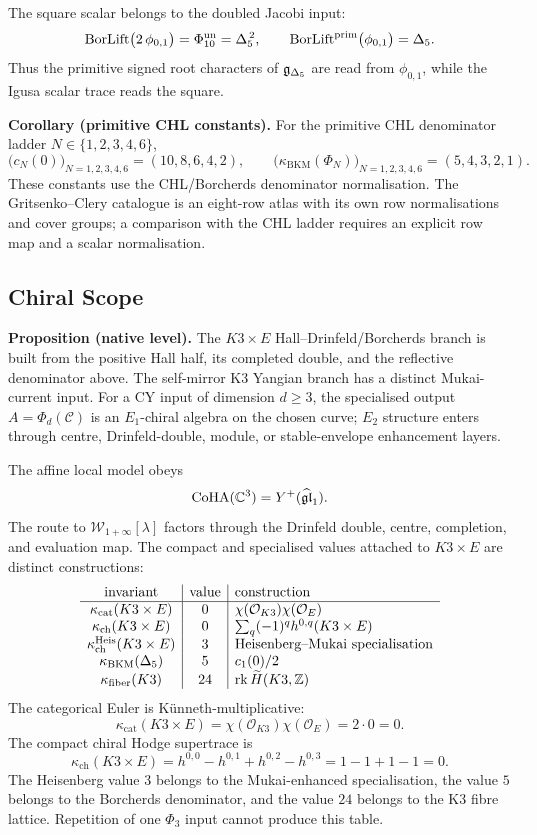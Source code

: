The square scalar belongs to the doubled Jacobi input:
\[
\mathrm{BorLift}\bigl(2\,\phi_{0,1}\bigr)=\Phi{}_{10}^{\mathrm{un}}
=\Delta{}_{5}^{\,2}, \qquad
\mathrm{BorLift}^{\mathrm{prim}}\bigl(\phi_{0,1}\bigr)=\Delta{}_{5} .
\]
Thus the primitive signed root characters of
$\mathfrak{g}_{\Delta{}_{5}}$ are read from $\phi_{0,1}$, while the
Igusa scalar trace reads the square.

\noindent\textbf{Corollary (primitive CHL constants).}
For the primitive CHL denominator ladder
$N\in\{1,2,3,4,6\}$,
\[
\bigl(c_N(0)\bigr)_{N=1,2,3,4,6}=(10,8,6,4,2),\qquad
\bigl(\kappa_{\mathrm{BKM}}(\Phi_N)\bigr)_{N=1,2,3,4,6}=(5,4,3,2,1).
\]
These constants use the CHL/Borcherds denominator normalisation.
The Gritsenko--Clery catalogue is an eight-row atlas with its own row
normalisations and cover groups; a comparison with the CHL ladder
requires an explicit row map and a scalar normalisation.

\subsection*{Chiral Scope}

\noindent\textbf{Proposition (native level).}
The $K3\times E$ Hall--Drinfeld/Borcherds branch is built from the
positive Hall half, its completed double, and the reflective denominator
above. The self-mirror K3 Yangian branch has a distinct Mukai-current
input. For a CY input of dimension $d\geq 3$, the specialised output
$A=\Phi_d(\mathcal{C})$ is an $E_1$-chiral algebra on the chosen curve;
$E_2$ structure enters through centre, Drinfeld-double, module, or
stable-envelope enhancement layers.

The affine local model obeys
\[
\operatorname{CoHA}(\mathbb{C}^{3})=Y^+(\widehat{\mathfrak{gl}}_1).
\]
The route to $\mathcal{W}_{1+\infty}[\lambda]$ factors through the
Drinfeld double, centre, completion, and evaluation map. The compact
and specialised values attached to $K3\times E$ are distinct
constructions:
\[
\begin{array}{c|c|l}
\text{invariant} & \text{value} & \text{construction}\\
\hline
\kappa_{\mathrm{cat}}(K3\times E) & 0 &
\chi(\mathcal{O}_{K3})\chi(\mathcal{O}_{E})\\
\kappa_{\mathrm{ch}}(K3\times E) & 0 &
\sum_q(-1)^q h^{0,q}(K3\times E)\\
\kappa_{\mathrm{ch}}^{\mathrm{Heis}}(K3\times E) & 3 &
\text{Heisenberg--Mukai specialisation}\\
\kappa_{\mathrm{BKM}}(\Delta{}_{5}) & 5 &
c_1(0)/2\\
\kappa_{\mathrm{fiber}}(K3) & 24 &
\mathrm{rk}\,\widetilde H(K3,\mathbb{Z})
\end{array}
\]
The categorical Euler is K\"unneth-multiplicative:
\[
\kappa_{\mathrm{cat}}(K3\times E)
=\chi(\mathcal{O}_{K3})\chi(\mathcal{O}_{E})
=2\cdot 0
=0 .
\]
The compact chiral Hodge supertrace is
\[
\kappa_{\mathrm{ch}}(K3\times E)
=h^{0,0}-h^{0,1}+h^{0,2}-h^{0,3}
=1-1+1-1
=0 .
\]
The Heisenberg value $3$ belongs to the Mukai-enhanced specialisation,
the value $5$ belongs to the Borcherds denominator, and the value $24$
belongs to the K3 fibre lattice. Repetition of one $\Phi_3$ input
cannot produce this table.

